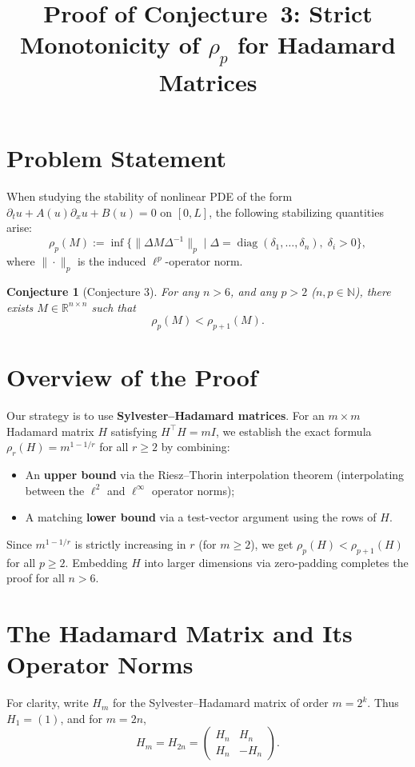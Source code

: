 \documentclass{article}
\title{Proof of Conjecture~3: Strict Monotonicity of $\rho_p$ for Hadamard Matrices}
\author{}
\date{}
\newtheorem{conjecture}{Conjecture}
\begin{document}
\maketitle

\section*{Problem Statement}

When studying the stability of nonlinear PDE of the form $\partial_t u + A(u)\partial_x u + B(u) = 0$ on $[0, L]$, the following stabilizing quantities arise:
\[
\rho_p(M) := \inf\{\|\Delta M \Delta^{-1}\|_p \mid \Delta = \operatorname{diag}(\delta_1, \ldots, \delta_n),\; \delta_i > 0\},
\]
where $\|\cdot\|_p$ is the induced $\ell^p$-operator norm.

\begin{conjecture}[Conjecture 3]
For any $n > 6$, and any $p > 2$ ($n, p \in \mathbb{N}$), there exists $M \in \mathbb{R}^{n \times n}$ such that
\[
\rho_p(M) < \rho_{p+1}(M).
\]
\end{conjecture}

\section*{Overview of the Proof}

Our strategy is to use \textbf{Sylvester--Hadamard matrices}. For an $m \times m$ Hadamard matrix $H$ satisfying $H^\top H = mI$, we establish the exact formula $\rho_r(H) = m^{1-1/r}$ for all $r \geq 2$ by combining:
\begin{itemize}
\item An \textbf{upper bound} via the Riesz--Thorin interpolation theorem (interpolating between the $\ell^2$ and $\ell^\infty$ operator norms);
\item A matching \textbf{lower bound} via a test-vector argument using the rows of $H$.
\end{itemize}
Since $m^{1-1/r}$ is strictly increasing in $r$ (for $m \geq 2$), we get $\rho_p(H) < \rho_{p+1}(H)$ for all $p \geq 2$. Embedding $H$ into larger dimensions via zero-padding completes the proof for all $n > 6$.

\section{The Hadamard Matrix and Its Operator Norms}

For clarity, write $H_m$ for the Sylvester--Hadamard matrix of order $m=2^k$. Thus $H_1=(1)$, and for $m=2n$,
\[
H_m = H_{2n} = \begin{pmatrix} H_n & H_n\\ H_n & -H_n \end{pmatrix}.
\]
\end{document}
